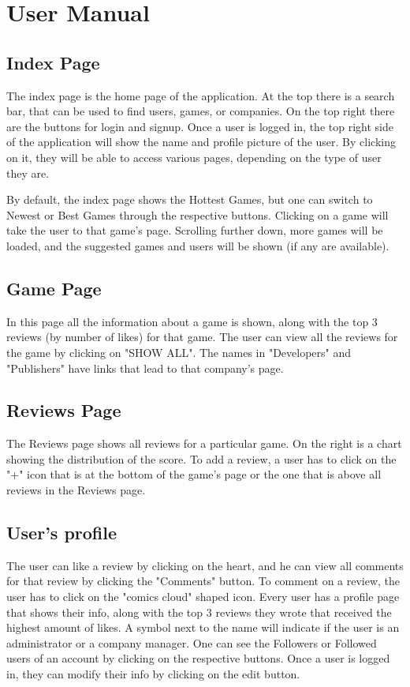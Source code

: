 \chapter{User Manual}
\section{Index Page}
The index page is the home page of the application. At the top there is a search bar, that can be used to find users, games, or companies. On the top right there are the buttons for login and signup. Once a user is logged in, the top right side of the application will show the name and profile picture of the user. By clicking on it, they will be able to access various pages, depending on the type of user they are. 

By default, the index page shows the Hottest Games, but one can switch to Newest or Best Games through the respective buttons. Clicking on a game will take the user to that game's page. Scrolling further down, more games will be loaded, and the suggested games and users will be shown (if any are available).
\section{Game Page}
In this page all the information about a game is shown, along with the top 3 reviews (by number of likes) for that game. The user can view all the reviews for the game by clicking on "SHOW ALL". The names in "Developers" and "Publishers" have links that lead to that company's page.
\section{Reviews Page}
The Reviews page shows all reviews for a particular game. On the right is a chart showing the distribution of the score. To add a review, a user has to click on the "+" icon that is at the bottom of the game's page or the one that is above all reviews in the Reviews page.
\section{User's profile} The user can like a review by clicking on the heart, and he can view all comments for that review by clicking the "Comments" button.
To comment on a review, the user has to click on the "comics cloud" shaped icon.
Every user has a profile page that shows their info, along with the top 3 reviews they wrote that received the highest amount of likes. A symbol next to the name will indicate if the user is an administrator or a company manager. One can see the Followers or Followed users of an account by clicking on the respective buttons. Once a user is logged in, they can modify their info by clicking on the edit button. 
